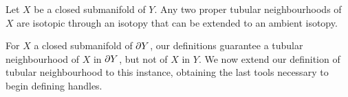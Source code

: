 \begin{theorem}
	Let $X$ be a closed submanifold of $Y$.
	Any two proper tubular neighbourhoods of $X$ are isotopic through an isotopy that can be extended to an ambient isotopy.
\end{theorem}






For $X$ a closed submanifold of $\partial Y$, our definitions guarantee a tubular neighbourhood of $X$ in $\partial Y$, but not of $X$ in $Y$.
We now extend our definition of tubular neighbourhood to this instance, obtaining the last tools necessary to begin defining handles.


